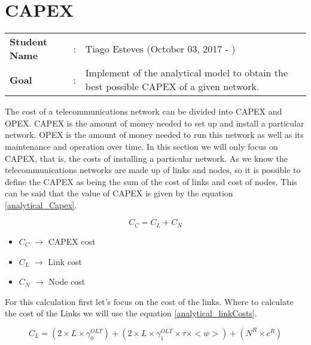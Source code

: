 \clearpage

\section{CAPEX}
\begin{tcolorbox}	
\begin{tabular}{p{2.75cm} p{0.2cm} p{10.5cm}} 	
\textbf{Student Name}  &:& Tiago Esteves    (October 03, 2017 - )\\
\textbf{Goal}          &:& Implement of the analytical model to obtain the best possible CAPEX of a given network.
\end{tabular}
\end{tcolorbox}
\vspace{11pt}

The cost of a telecommunications network can be divided into CAPEX and OPEX.
CAPEX is the amount of money needed to set up and install a particular network.
OPEX is the amount of money needed to run this network as well as its maintenance and operation over time.
In this section we will only focus on CAPEX, that is, the costs of installing a particular network.
As we know the telecommunications networks are made up of links and nodes, so it is possible to define the CAPEX as being the sum of the cost of links and cost of nodes.
This can be said that the value of CAPEX is given by the equation \ref{analytical_Capex}.

\begin{equation}
C_C = C_L + C_N
\label{analytical_Capex}
\end{equation}

\begin{itemize}
\item{$C_C$				$\rightarrow$	CAPEX cost}
\item{$C_L$				$\rightarrow$	Link cost}
\item{$C_N$				$\rightarrow$	Node cost}
\end{itemize}

\vspace{11pt}
For this calculation first let's focus on the cost of the links. Where to calculate the cost of the Links we will use the equation \ref{analytical_linkCosts}.

\begin{equation}
C_L = \left(2 \times L \times \gamma_0^{OLT}\right) + \left(2 \times L \times \gamma_1^{OLT} \times \tau \times <w>\right) + \left(N^R \times c^R\right)
\label{analytical_linkCosts}
\end{equation}


